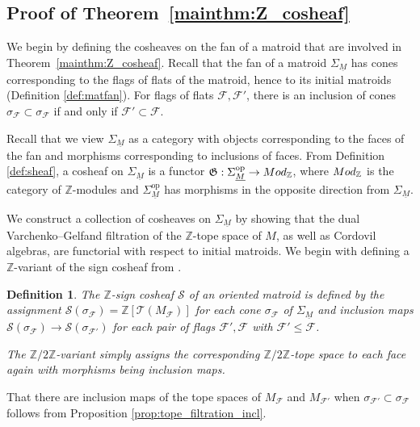 \documentclass{amsart}
\newtheorem{definition}[theorem]{Definition}
\newcommand\Fcal{{\mathcal F}}
\newcommand\Tcal{{\mathcal T}}
\newcommand\Scal{{\mathcal S}}
\newcommand\ZZ{{\mathbb Z}}
\newcommand\Ztwo{{\mathbb Z}/2{\mathbb Z}}
\begin{document}
{\subsection{Proof of Theorem~\ref{mainthm:Z_cosheaf}} \label{sec:ThmC}

We begin by defining the cosheaves on the fan of a matroid that are involved in Theorem~\ref{mainthm:Z_cosheaf}. 
Recall that the fan of a matroid $\Sigma_{\underline{M}}$ has cones corresponding to the flags of flats of the matroid, hence to its initial matroids (Definition \ref{def:matfan}). 
For flags of flats $\mathcal{F}, \mathcal{F}'$, there is an inclusion of cones $\sigma_{\mathcal{F}} \subset \sigma_{\mathcal{F}} $ if and only if $\mathcal{F}' \subset \mathcal{F}$. 

Recall that we view $\Sigma_{\underline{M}}$ as a category with objects corresponding to the  faces of the fan  and morphisms corresponding to inclusions of faces. From Definition \ref{def:sheaf}, a cosheaf on $\Sigma_{\underline{M}}$ is a  functor 
$\mathfrak{G}: \Sigma_{\underline{M}}^{\text{op}} \to  {\rm Mod}_{\ZZ}$, where $ {\rm Mod}_{\ZZ}$ is the category of $\ZZ$-modules and $\Sigma_{\underline{M}}^{\text{op}}$  has morphisms in the opposite direction from $\Sigma_{\underline{M}}.$ 

We construct a collection of cosheaves on $\Sigma_{\underline{M}}$ by showing that the dual Varchenko--Gelfand filtration of the $\ZZ$-tope space of $M$, as well as Cordovil algebras, are functorial with respect to initial matroids. We begin with defining a $\ZZ$-variant of the sign cosheaf from \cite{RS}. 

\begin{definition}\label{def:signcosheaf}
The $\ZZ$-sign cosheaf $\Scal$ of an oriented matroid is defined by the assignment 
$\Scal(\sigma_{\mathcal{F}}) = \ZZ[\Tcal(M_\Fcal)]$ for each cone $\sigma_{\Fcal}$ of $\Sigma_{\underline{M}}$ and inclusion maps $\Scal(\sigma_{\mathcal{F}}) \to \Scal(\sigma_{\mathcal{F}'})$ for each pair of flags $\mathcal{F}', \mathcal{F}$ with $\mathcal{F}' \leq \mathcal{F}$.

The $\Ztwo$-variant simply assigns the corresponding $\Ztwo$-tope space to each face again with morphisms being inclusion maps. 
\end{definition}

That there are inclusion maps of the tope spaces of $M_\mathcal{F}$ and $M_{\mathcal{F}'}$ when $\sigma_{\mathcal{F}'} \subset \sigma_{\mathcal{F}}$ follows from Proposition \ref{prop:tope_filtration_incl}.
 
}
\end{document}
